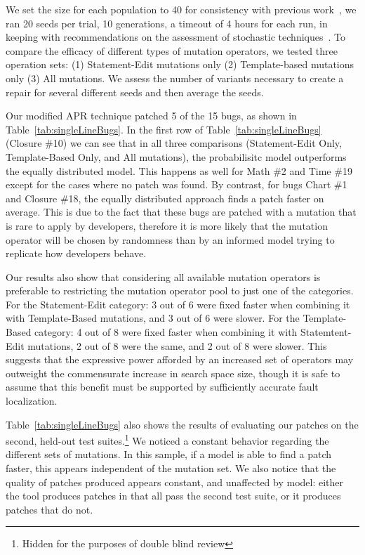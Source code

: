 \documentclass[conference]{IEEEtran}
\begin{document}
We set the size for each population to 40 for consistency with 
previous work~\cite{legoues12,kim2013}, we ran 20
seeds per trial, 10 generations, a timeout of 4 hours for each run, in keeping with 
recommendations on the assessment of stochastic techniques~\cite{arcuri11}.
To compare the efficacy of different types of mutation operators,
we tested three operation sets: (1) Statement-Edit mutations only (2) Template-based mutations 
only (3) All mutations.  We assess the number of variants necessary to create a repair for several different seeds and then average the seeds. 

Our modified APR technique patched 5 of the 15 bugs, as shown in 
Table~\ref{tab:singleLineBugs}. In the first row of Table~\ref{tab:singleLineBugs} (Closure \#10) we can see
that in all three comparisons (Statement-Edit Only, Template-Based Only, and All
mutations), the probabilisitc model outperforms
the equally distributed model. This happens as well for
Math \#2 and Time \#19 except for the cases where no patch was
found. By contrast, for bugs Chart \#1 and Closure \#18, the equally
distributed approach finds a patch faster on average. This is due to the fact
that these bugs are patched with a mutation that is rare to apply by developers,
therefore it is more likely that the mutation operator will be chosen by randomness
than by an informed model trying to replicate how developers behave.

Our results also show that considering all available mutation operators is
preferable to 
restricting the mutation operator pool to just one of the categories. For the
Statement-Edit category: 3 out of 6 were fixed faster when combining it with
Template-Based mutations, and 3 out of 6 were slower. For the Template-Based
category: 4 out of 8 were fixed faster when combining it with Statemtent-Edit
mutations, 2 out of 8 were the same, and 2 out of 8 were slower. This suggests
that the expressive power afforded by an increased set of operators may
outweight the commensurate increase in search space size, though it is safe to
assume that this benefit must be supported by sufficiently accurate fault
localization. 

Table~\ref{tab:singleLineBugs} also shows the results of evaluating our patches
on the second, held-out test suites.\footnote{Hidden for the purposes of double blind review} %
We noticed a
constant behavior regarding the different sets of mutations. In this sample, if
a model is able to find a patch faster, this appears independent of the mutation
set.  We also notice that
the quality of patches produced  appears constant, and unaffected by model:
either the tool produces patches in 
that all pass the second test suite, or it produces patches that do not. 
\end{document}
